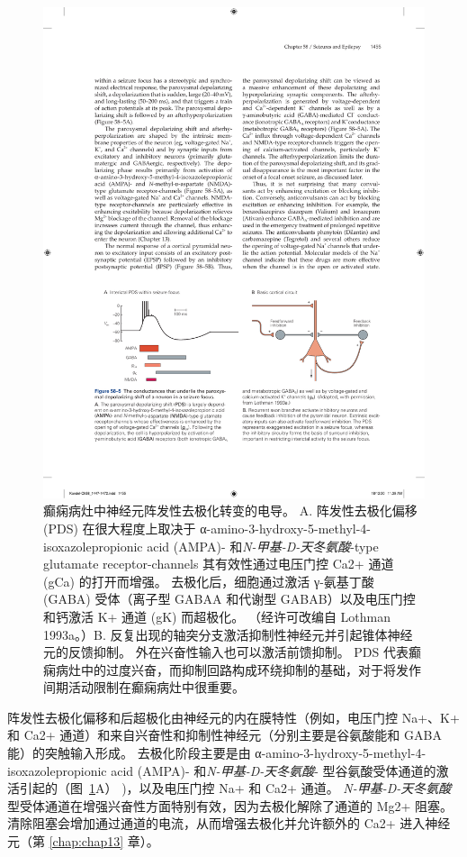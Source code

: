 \begin{figure}[htbp]
	\centering
	\includegraphics[width=0.9\linewidth]{chap58/fig_58_5}
	\caption{癫痫病灶中神经元阵发性去极化转变的电导。 A. 阵发性去极化偏移 (PDS) 在很大程度上取决于 α-amino-3-hydroxy-5-methyl-4-isoxazolepropionic acid (AMPA)- 和\textit{N-甲基-D-天冬氨酸}-type glutamate receptor-channels 其有效性通过电压门控 Ca2+ 通道 (gCa) 的打开而增强。 去极化后，细胞通过激活 γ-氨基丁酸 (GABA) 受体（离子型 GABAA 和代谢型 GABAB）以及电压门控和钙激活 K+ 通道 (gK) 而超极化。 （经许可改编自 Lothman 1993a。）B. 反复出现的轴突分支激活抑制性神经元并引起锥体神经元的反馈抑制。 外在兴奋性输入也可以激活前馈抑制。 PDS 代表癫痫病灶中的过度兴奋，而抑制回路构成环绕抑制的基础，对于将发作间期活动限制在癫痫病灶中很重要。}
	\label{fig:58_5}
\end{figure}


阵发性去极化偏移和后超极化由神经元的内在膜特性（例如，电压门控 Na+、K+ 和 Ca2+ 通道）和来自兴奋性和抑制性神经元（分别主要是谷氨酸能和 GABA 能）的突触输入形成。
去极化阶段主要是由 α-amino-3-hydroxy-5-methyl-4-isoxazolepropionic acid (AMPA)- 和\textit{N-甲基-D-天冬氨酸}- 型谷氨酸受体通道的激活引起的（图~\ref{fig:58_5}A） )，以及电压门控 Na+ 和 Ca2+ 通道。
\textit{N-甲基-D-天冬氨酸}型受体通道在增强兴奋性方面特别有效，因为去极化解除了通道的 Mg2+ 阻塞。
清除阻塞会增加通过通道的电流，从而增强去极化并允许额外的 Ca2+ 进入神经元（第 \ref{chap:chap13} 章）。


